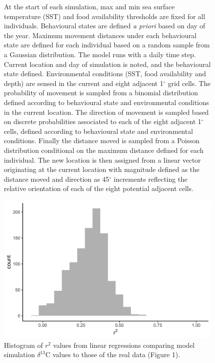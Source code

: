 \documentclass[a4paper,10pt]{article}
\begin{document}
\begin{landscape}
\begin{figure}[!htbp]
{  At the start of each simulation, max and min sea surface temperature (SST) and food availability thresholds are fixed for all individuals. Behavioural states are defined \textit{a priori} based on day of the year. Maximum movement distances under each behavioural state are defined for each individual based on a random sample from a Gaussian distribution. The model runs with a daily time step. Current location and day of simulation is noted, and the behavioural state defined. Environmental conditions (SST, food availability and depth) are sensed in the current and eight adjacent 1$^{\circ}$ grid cells. The probability of movement is sampled from a binomial distribution defined according to behavioural state and environmental conditions in the current location. The direction of movement is sampled based on discrete probabilities associated to each of the eight adjacent 1$^{\circ}$ cells, defined according to behavioural state and environmental conditions. Finally the distance moved is sampled from a Poisson distribution conditional on the maximum distance defined for each individual. The new location is then assigned from a linear vector originating at the current location with magnitude defined as the distance moved and direction as 45$^{\circ}$ increments reflecting the relative orientation of each of the eight potential adjacent cells.}
  \label{figs5}
\end{figure}

\end{landscape}

\newpage

  \begin{figure}[!htbp]
    \centering
      \includegraphics[width=\linewidth]{figures/Figure-S6-r2.png}
      \caption{Histogram of $r^2$ values from linear regressions comparing model simulation $\delta^{13}$C values to those of the real data (Figure 1).} %
      \label{figs6}
  \end{figure}
\end{document}
